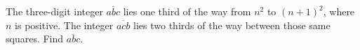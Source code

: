The three-digit integer $\overline{abc}$ lies one third of the way from $n^2$ to $(n+1)^2$, where $n$ is positive. The integer $\overline{acb}$ lies two thirds of the way between those same squares. Find $\overline{abc}$.
